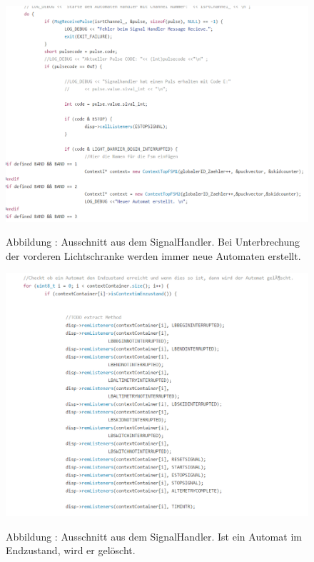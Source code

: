 \documentclass[a4paper, 11pt]{article}
\begin{document}
\begin{figure}[H]
\centering 
    \includegraphics[scale=0.7]{ISR/sighandler.png}
    
    \small Abbildung \theimgcounter : Ausschnitt aus dem SignalHandler. Bei Unterbrechung der vorderen Lichtschranke werden immer neue Automaten erstellt.
    \label{sighandler}
\end{figure}

\newpage

\begin{figure}[H]
\centering 
    \includegraphics[scale=0.7]{ISR/dellist.png}
    
    \small Abbildung \theimgcounter : Ausschnitt aus dem SignalHandler. Ist ein Automat im Endzustand, wird er gelöscht.
    \label{dellist}
\end{figure}
\end{document}

